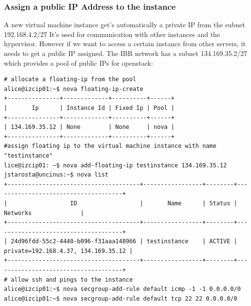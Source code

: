 \documentclass[a4paper,bibtotoc,english,liststotoc]{scrartcl}
\begin{document}
\subsubsection{Assign a public IP Address to the instance}
A new virtual machine instance get's automatically a private IP from
the subnet 192.168.4.2/27 It's used for communication with other
instances and the hypervisor. However if we want to access a certain
instance from other servers, it needs to get a public IP assigned. 
The IBR network has a subnet 134.169.35.2/27 which provides a pool of
public IPs for openstack:
\begin{verbatim}
# allocate a floating-ip from the pool
alice@izcip01:~$ nova floating-ip-create
+---------------+-------------+----------+------+
|       Ip      | Instance Id | Fixed Ip | Pool |
+---------------+-------------+----------+------+
| 134.169.35.12 | None        | None     | nova |
+---------------+-------------+----------+------+
#assign floating ip to the virtual machine instance with name "testinstance"
lice@izcip01: ~$ nova add-floating-ip testinstance 134.169.35.12
jstarosta@uncinus:~$ nova list
+--------------------------------------+-----------------+--------+-------------------------------------+
|                  ID                  |       Name      | Status |               Networks              |
+--------------------------------------+-----------------+--------+-------------------------------------+
| 24d96fdd-55c2-4440-b096-f31aaa148966 | testinstance    | ACTIVE | private=192.168.4.37, 134.169.35.12 |
+--------------------------------------+-----------------+--------+-------------------------------------+
# allow ssh and pings to the instance
alice@izcip01:~$ nova secgroup-add-rule default icmp -1 -1 0.0.0.0/0
alice@izcip01:~$ nova secgroup-add-rule default tcp 22 22 0.0.0.0/0

\end{verbatim}
\end{document}
